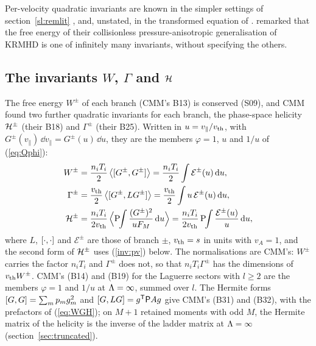 Per-velocity quadratic invariants are known in the simpler settings of section~\ref{sl:remlit} \citep{PlunkParker2014,Plunk2015}, and, unstated, in the transformed equation of \citet[eq.~85]{Heninger2018}. \citet[\S5.1]{Kunz2015} remarked that the free energy of their collisionless pressure-anisotropic generalisation of KRMHD is one of infinitely many invariants, without specifying the others.

\subsection{The invariants \texorpdfstring{$W$, $\Gamma$ and $\mathcal H$}{W, Gamma and H}}\label{inv:cmm}

The free energy $W^\pm$ of each branch (CMM's B13) is conserved (S09), and CMM found two further quadratic invariants for each branch, the phase-space helicity $\mathcal H^\pm$ (their B18) and $\Gamma^\pm$ (their B25). Written in $u=v_\parallel/v_{\mathrm{th}}$, with $G^\pm(v_\parallel)\,\dd v_\parallel=G^\pm(u)\,\dd u$, they are the members $\varphi=1$, $u$ and $1/u$ of (\ref{eq:Qphi}):
\begin{equation}\label{eq:WGH}
\begin{aligned}
  W^\pm&=\frac{n_iT_i}{2}\,\big\langle[G^\pm,G^\pm]\big\rangle=\frac{n_iT_i}{2}\int\mathcal E^\pm(u)\,\mathrm{d} u,\\
  \Gamma^\pm&=\frac{v_{\mathrm{th}}}{2}\,\big\langle[G^\pm,LG^\pm]\big\rangle=\frac{v_{\mathrm{th}}}{2}\int u\,\mathcal E^\pm(u)\,\mathrm{d} u,\\
  \mathcal H^\pm&=\frac{n_iT_i}{2v_{\mathrm{th}}}\,\Big\langle\mathrm{P}\!\!\int\frac{(G^\pm)^2}{uF_M}\,\mathrm{d} u\Big\rangle=\frac{n_iT_i}{2v_{\mathrm{th}}}\,\mathrm{P}\!\!\int\frac{\mathcal E^\pm(u)}{u}\,\mathrm{d} u ,
\end{aligned}
\end{equation}
where $L$, $[\cdot,\cdot]$ and $\mathcal E^\pm$ are those of branch $\pm$, $v_{\mathrm{th}}=s$ in units with $v_A=1$, and the second form of $\mathcal H^\pm$ uses (\ref{inv:pv}) below. The normalisations are CMM's: $W^\pm$ carries the factor $n_iT_i$ and $\Gamma^\pm$ does not, so that $n_iT_i\Gamma^\pm$ has the dimensions of $v_{\mathrm{th}} W^\pm$. CMM's (B14) and (B19) for the Laguerre sectors with $l\ge2$ are the members $\varphi=1$ and $1/u$ at $\Lambda=\infty$, summed over $l$. The Hermite forms $[G,G]=\sum_mp_mg_m^2$ and $[G,LG]=g^{\mathsf T}\mathsf P Ag$ give CMM's (B31) and (B32), with the prefactors of (\ref{eq:WGH}); on $M+1$ retained moments with odd $M$, the Hermite matrix of the helicity is the inverse of the ladder matrix at $\Lambda=\infty$ (section~\ref{sec:truncated}).

